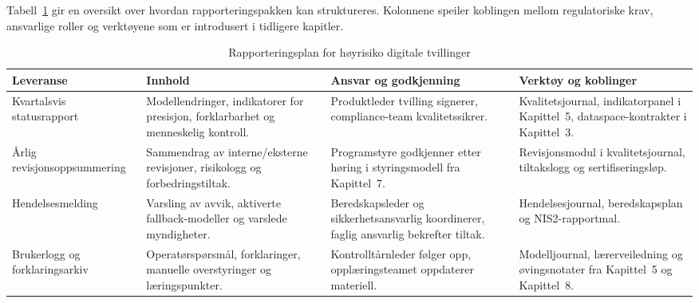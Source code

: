 Tabell~\ref{tab:kap06-tilsynsplan} gir en oversikt over hvordan rapporteringspakken kan struktureres. Kolonnene speiler koblingen mellom regulatoriske krav, ansvarlige roller og verktøyene som er introdusert i tidligere kapitler.

\begin{table}[htbp]
    \centering
    \caption{Rapporteringsplan for høyrisiko digitale tvillinger}
    \label{tab:kap06-tilsynsplan}
    \begin{tabular}{p{3.2cm}p{4.6cm}p{3.8cm}p{3.4cm}}
        \toprule
        \textbf{Leveranse} & \textbf{Innhold} & \textbf{Ansvar og godkjenning} & \textbf{Verktøy og koblinger} \\
        \midrule
        Kvartalsvis statusrapport & Modellendringer, indikatorer for presisjon, forklarbarhet og menneskelig kontroll. & Produktleder tvilling signerer, compliance-team kvalitetssikrer. & Kvalitetsjournal, indikatorpanel i Kapittel~5, dataspace-kontrakter i Kapittel~3. \\
        \addlinespace
        Årlig revisjonsoppsummering & Sammendrag av interne/eksterne revisjoner, risikologg og forbedringstiltak. & Programstyre godkjenner etter høring i styringsmodell fra Kapittel~7. & Revisjonsmodul i kvalitetsjournal, tiltakslogg og sertifiseringsløp. \\
        \addlinespace
        Hendelsesmelding & Varsling av avvik, aktiverte fallback-modeller og varslede myndigheter. & Beredskapsleder og sikkerhetsansvarlig koordinerer, faglig ansvarlig bekrefter tiltak. & Hendelsesjournal, beredskapsplan og NIS2-rapportmal. \\
        \addlinespace
        Brukerlogg og forklaringsarkiv & Operatørspørsmål, forklaringer, manuelle overstyringer og læringspunkter. & Kontrolltårnleder følger opp, opplæringsteamet oppdaterer materiell. & Modelljournal, lærerveiledning og øvingsnotater fra Kapittel~5 og Kapittel~8. \\
        \bottomrule
    \end{tabular}
\end{table}

